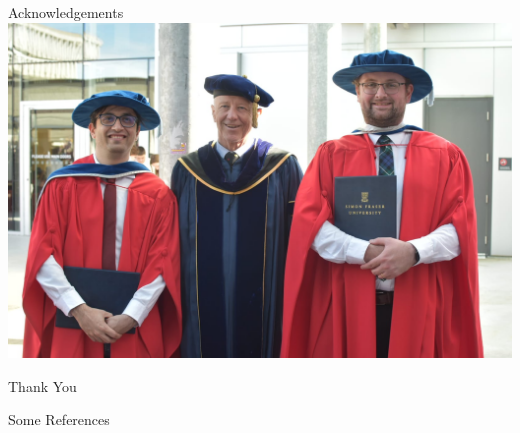 \documentclass[14pt]{beamer}
\begin{document}


\begin{frame}{Acknowledgements}
    \includegraphics[width=\textwidth]{Figures/Convocation Image.jpg}
\end{frame}

\begin{frame}
    \centering
    \Huge Thank You
\end{frame}

\begin{frame}{Some References}
    
    
\end{frame}
\end{document}
